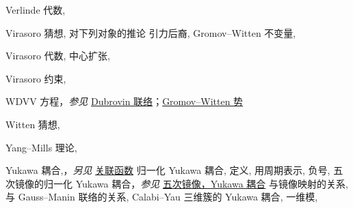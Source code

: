 \begin{theindex}
\indexspace
\item \leavevmode\hypertarget{idx:1398}{Verlinde 代数},\enspace{}
\indexspace
\item \leavevmode\hypertarget{idx:1401}{Virasoro 猜想},\enspace{}
\subitem \leavevmode\hypertarget{idx:1402}{对下列对象的推论}
\subsubitem \leavevmode\hypertarget{idx:1403}{引力后裔},\enspace{}
\subsubitem \leavevmode\hypertarget{idx:1404}{Gromov--Witten 不变量},\enspace{}
\indexspace
\item \leavevmode\hypertarget{idx:1399}{Virasoro 代数},\enspace{}
\subitem \leavevmode\hypertarget{idx:1400}{中心扩张},\enspace{}
\indexspace
\item \leavevmode\hypertarget{idx:1405}{Virasoro 约束},\enspace{}
\indexspace
\item \leavevmode\hypertarget{source:492}{}\hypertarget{idx:1430}{WDVV 方程}，\textit{参见} \hyperlink{idx:0226}{Dubrovin 联络}；\hyperlink{idx:0552}{Gromov--Witten 势}
\indexspace
\item \leavevmode\hypertarget{idx:1439}{Witten 猜想},\enspace{}
\indexspace
\item \leavevmode\hypertarget{idx:1443}{Yang--Mills 理论},\enspace{}
\indexspace
\item \leavevmode\hypertarget{idx:1444}{Yukawa 耦合},\enspace{}，\textit{另见} \hyperlink{idx:0183}{关联函数}
\subitem \leavevmode\hypertarget{idx:1445}{归一化 Yukawa 耦合},\enspace{}
\subsubitem \leavevmode\hypertarget{idx:1446}{定义},\enspace{}
\subsubitem \leavevmode\hypertarget{idx:1447}{用周期表示},\enspace{}
\subsubitem \leavevmode\hypertarget{idx:1448}{负号},\enspace{}
\subsubitem \leavevmode\hypertarget{idx:1449}{五次镜像的归一化 Yukawa 耦合}，\textit{参见} \hyperlink{idx:1179}{五次镜像，Yukawa 耦合}
\subsubitem \leavevmode\hypertarget{idx:1450}{与镜像映射的关系},\enspace{}
\subsubitem \leavevmode\hypertarget{idx:1451}{与 Gauss--Manin 联络的关系},\enspace{}
\subitem \leavevmode\hypertarget{idx:1452}{Calabi--Yau 三维簇的 Yukawa 耦合},\enspace{}
\subsubitem \leavevmode\hypertarget{idx:1453}{一维模},\enspace{}

\end{theindex}
